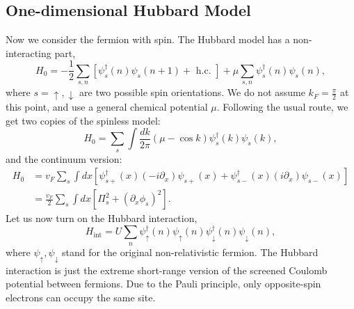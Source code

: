 \documentclass[aps,prb,superscriptaddress,nofootinbib]{revtex4}
\begin{document}
\subsection{One-dimensional Hubbard Model}
Now we consider the fermion with spin.
The Hubbard model has a non-interacting part,
\begin{equation}
	H_{0}=-\frac{1}{2} \sum_{s, n}\left[\psi_{s}^{\dagger}(n) \psi_{s}(n+1)+\text { h.c. }\right]+\mu \sum_{s, n} \psi_{s}^{\dagger}(n) \psi_{s}(n),
\end{equation}
where $s=\uparrow, \downarrow$ are two possible spin orientations. We do not assume $k_F = \frac{\pi}{2}$ at this point, and use a general chemical potential $\mu$.
Following the usual route, we get two copies of the spinless model:
\begin{equation}
	H_{0}=\sum_{s} \int \frac{d k}{2 \pi} (\mu-\cos k) \psi_{s}^{\dagger}(k) \psi_{s}(k),
\end{equation}
and the continuum version:
\begin{equation}
\begin{aligned}
	H_0 &= v_F \sum_{s} \int d x \left[
		\psi_{s+}^{\dagger}(x)\left(-i \partial_{x}\right) \psi_{s+}(x) +
		\psi_{s-}^{\dagger}(x)\left( i \partial_{x}\right) \psi_{s-}(x)
	\right] \\
	&= \frac{v_F}{2} \sum_s \int d x \left[\Pi_{s}^{2}+\left(\partial_x \phi_{s}\right)^{2}\right].
\end{aligned}
\end{equation}
Let us now turn on the Hubbard interaction,
\begin{equation}
	H_{\mathrm{int}}=U \sum_{n} \psi_{\uparrow}^{\dagger}(n) \psi_{\uparrow}(n) \psi_{\downarrow}^{\dagger}(n) \psi_{\downarrow}(n),
\end{equation}
where $\psi_{\uparrow}, \psi_{\downarrow}$ stand for the original non-relativistic fermion. 
The Hubbard interaction is just the extreme short-range version of the screened Coulomb potential between fermions. 
Due to the Pauli principle, only opposite-spin electrons can occupy the same site.
\end{document}

